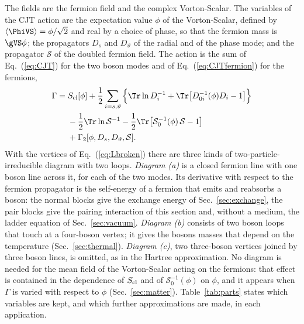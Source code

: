 The fields are the fermion field and the complex Vorton-Scalar. The variables of the CJT action are
the expectation value $\phi$ of the Vorton-Scalar, defined by $\langle\PhiVS\rangle=\phi/\sqrt2$ and
real by a choice of phase, so that the fermion mass is $\gVS\phi$; the propagators $D_s$ and
$D_\vartheta$ of the radial and of the phase mode; and the propagator $\mathcal S$ of the doubled
fermion field. The action is the sum of Eq.~(\ref{eq:CJT}) for the two boson modes and of
Eq.~(\ref{eq:CJTfermion}) for the fermions,
\begin{align}
\Gamma={}&S_{\rm cl}[\phi]
+\frac12\sum_{i=s,\vartheta}\Big\{\Tr\ln D_i^{-1}+\Tr\big[D_{0i}^{-1}(\phi)D_i-1\big]\Big\}\nonumber\\
&-\frac12\Tr\ln\mathcal S^{-1}-\frac12\Tr\big[\mathcal S_0^{-1}(\phi)\,\mathcal S-1\big]\nonumber\\
&+\Gamma_2[\phi,D_s,D_\vartheta,\mathcal S].
\label{eq:action}
\end{align}
With the vertices of Eq.~(\ref{eq:Lbroken}) there are three kinds of two-particle-irreducible diagram
with two loops. \emph{Diagram (a)} is a closed fermion line with one boson line across it, for each of
the two modes. Its derivative with respect to the fermion propagator is the self-energy of a fermion
that emits and reabsorbs a boson: the normal blocks give the exchange energy of
Sec.~\ref{sec:exchange}, the pair blocks give the pairing interaction of this section and, without a
medium, the ladder equation of Sec.~\ref{sec:vacuum}. \emph{Diagram (b)} consists of two boson loops
that touch at a four-boson vertex; it gives the bosons masses that depend on the temperature
(Sec.~\ref{sec:thermal}). \emph{Diagram (c)}, two three-boson vertices joined by three boson lines, is
omitted, as in the Hartree approximation. No diagram is needed for the mean field of the Vorton-Scalar
acting on the fermions: that effect is contained in the dependence of $S_{\rm cl}$ and of
$\mathcal S_0^{-1}(\phi)$ on $\phi$, and it appears when $\Gamma$ is varied with respect to $\phi$
(Sec.~\ref{sec:matter}). Table~\ref{tab:parts} states which variables are kept, and which further
approximations are made, in each application.

